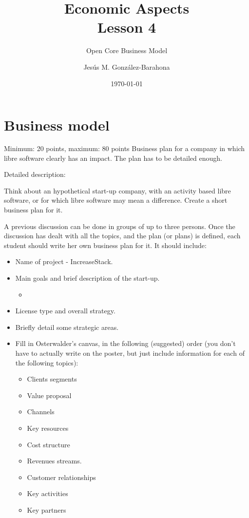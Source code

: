 \documentclass[11pt]{scrartcl}
\title{\textbf{Economic Aspects\\
                Lesson 4}}
\subtitle{Open Core Business Model}
\author{Jesús M. González-Barahona}
\date{\today}
\begin{document}
\maketitle

\section{Business model}

Minimum: 20 points, maximum: 80 points
Business plan for a company in which libre software clearly has an impact. The plan has to be detailed enough. 

Detailed description:

Think about an hypothetical start-up company, with an activity based libre software, or for which libre software may mean a difference. Create a short business plan for it.

A previous discussion can be done in groups of up to three persons. Once the discussion has dealt with all the topics, and the plan (or plans) is defined, each student should write her own business plan for it. It should include:

\begin{itemize}
    \item Name of project - IncreaseStack.
    \item Main goals and brief description of the start-up.
        \begin{itemize}
            \item 
        \end{itemize}
    \item License type and overall strategy.
    \item Briefly detail some strategic areas.

    \item Fill in Osterwalder’s canvas, in the following (suggested) order (you don’t have to actually write on the poster, but just include information for each of the following topics):
    \begin{itemize}
        \item Clients segments
        \item Value proposal
        \item Channels
        \item Key resources
        \item Cost structure
        \item Revenues streams.
        \item Customer relationships
        \item Key activities
        \item Key partners
    \end{itemize}
\end{itemize}
\end{document}

